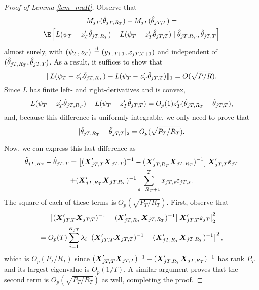 \documentclass[11pt]{article} \def\baselinestretch{1.08}
\begin{document}
\begin{proof}[Proof of Lemma \ref{lem_muR}]
  Observe that 
  \begin{multline*}
    \mmrT{j} - \mmtT{j} = \\ \E\left[L(\psi_T - z_T'\bT{j}{R_T}) -
    L(\psi_T - z_T'\bT{j}{T}) \mid \bT{j}{R_T},\bT{j}{T}\right]
  \end{multline*}
  almost surely, with $(\psi_T, z_T) \operatorname{{}\overset{d}{=}{}} (y_{T,{T+1}},x_{{j}T,{T+1}})$
  and independent of $(\hat \theta_{{j}T,{R_T}}, \hat \theta_{{j}T,{T}})$.  As a result, it
  suffices to show that
  \[
  \|L(\psi_T - z_T'\hat \theta_{{j}T,{R_T}}) - L(\psi_T - z_T'\hat \theta_{{j}T,{T}}) \|_1
  = O(\sqrt{P/R}).
  \]
  Since $L$ has finite left- and right-derivatives and is convex, 
  \[
  L(\psi_T - z_T'\hat \theta_{{j}T,{R_T}}) - L(\psi_T - z_T'\hat \theta_{{j}T,{T}})
  = O_p(1) z_T'(\hat \theta_{{j}T,{R_T}} - \hat \theta_{{j}T,{T}}),
  \]
  and, because this difference is uniformly integrable, we only need
  to prove that 
  \[
  |\hat \theta_{{j}T,{R_T}} - \hat \theta_{{j}T,{T}}|_2 = O_p(\sqrt{P_T/R_T}).
  \]

  Now, we can express this last difference as
  \begin{multline*}
  \hat \theta_{{j}T,{R_T}} - \hat \theta_{{j}T,{T}} = \left[
    (\boldsymbol{X}_{{j}T,{T}}'\boldsymbol{X}_{{j}T,{T}})^{-1} - (\boldsymbol{X}_{{j}T,{R_T}}'\boldsymbol{X}_{{j}T,{R_T}})^{-1}
  \right] \boldsymbol{X}_{{j}T,{T}}'\boldsymbol{\varepsilon}_{{j}{T}} \\
  + (\boldsymbol{X}_{{j}T,{R_T}}'\boldsymbol{X}_{{j}T,{R_T}})^{-1} \sum_{s=R_T+1}^T x_{{j}T,{s}} \varepsilon_{{j}T,{s}}.
  \end{multline*}
  The square of each of these terms is $O_p(\sqrt{P_T/R_T})$.  First,
  observe that
  \begin{multline*}
    \left\lvert \left[
    (\boldsymbol{X}_{{j}T,{T}}'\boldsymbol{X}_{{j}T,{T}})^{-1} - (\boldsymbol{X}_{{j}T,{R_T}}'\boldsymbol{X}_{{j}T,{R_T}})^{-1}
  \right] \boldsymbol{X}_{{j}T,{T}}'\boldsymbol{\varepsilon}_{{j}{T}} \right\rvert_2^2\\
  = O_p(T) \sum_{i=1}^{K_{jT}} \lambda_i\left[(\boldsymbol{X}_{{j}T,{T}}'\boldsymbol{X}_{{j}T,{T}})^{-1}
    - (\boldsymbol{X}_{{j}T,{R_T}}'\boldsymbol{X}_{{j}T,{R_T}})^{-1}\right]^2,
  \end{multline*}
  which is $O_p(P_T/R_T)$ since 
  $(\boldsymbol{X}_{{j}T,{T}}'\boldsymbol{X}_{{j}T,{T}})^{-1} - (\boldsymbol{X}_{{j}T,{R_T}}'\boldsymbol{X}_{{j}T,{R_T}})^{-1}$ has
  rank $P_T$ and its largest eigenvalue is $O_p(1/T)$.
  A similar argument proves that the second term is
  $O_p(\sqrt{P_T/R_T})$ as well, completing the proof.
\end{proof}



\end{document}
